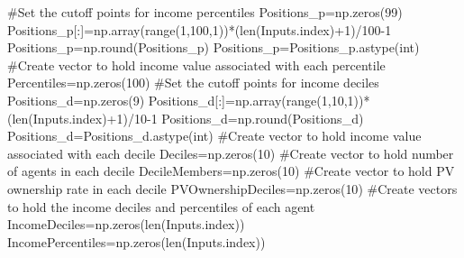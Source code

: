 \documentclass[
  letterpaper,
  DIV=11,
  numbers=noendperiod]{scrartcl}
\newenvironment{Shaded}{\begin{snugshade}}{\end{snugshade}}
\newcommand{\BuiltInTok}[1]{\textcolor[rgb]{0.00,0.23,0.31}{#1}}
\newcommand{\CommentTok}[1]{\textcolor[rgb]{0.37,0.37,0.37}{#1}}
\newcommand{\DecValTok}[1]{\textcolor[rgb]{0.68,0.00,0.00}{#1}}
\newcommand{\NormalTok}[1]{\textcolor[rgb]{0.00,0.23,0.31}{#1}}
\newcommand{\OperatorTok}[1]{\textcolor[rgb]{0.37,0.37,0.37}{#1}}
\begin{document}
\begin{Shaded}
\begin{Highlighting}[]
    \CommentTok{\#Set the cutoff points for income percentiles}
\NormalTok{    Positions\_p}\OperatorTok{=}\NormalTok{np.zeros(}\DecValTok{99}\NormalTok{)}
\NormalTok{    Positions\_p[:]}\OperatorTok{=}\NormalTok{np.array(}\BuiltInTok{range}\NormalTok{(}\DecValTok{1}\NormalTok{,}\DecValTok{100}\NormalTok{,}\DecValTok{1}\NormalTok{))}\OperatorTok{*}\NormalTok{(}\BuiltInTok{len}\NormalTok{(Inputs.index)}\OperatorTok{+}\DecValTok{1}\NormalTok{)}\OperatorTok{/}\DecValTok{100}\OperatorTok{{-}}\DecValTok{1}
\NormalTok{    Positions\_p}\OperatorTok{=}\NormalTok{np.}\BuiltInTok{round}\NormalTok{(Positions\_p)}
\NormalTok{    Positions\_p}\OperatorTok{=}\NormalTok{Positions\_p.astype(}\BuiltInTok{int}\NormalTok{)}
    \CommentTok{\#Create vector to hold income value associated with each percentile}
\NormalTok{    Percentiles}\OperatorTok{=}\NormalTok{np.zeros(}\DecValTok{100}\NormalTok{)}
    \CommentTok{\#Set the cutoff points for income deciles}
\NormalTok{    Positions\_d}\OperatorTok{=}\NormalTok{np.zeros(}\DecValTok{9}\NormalTok{)}
\NormalTok{    Positions\_d[:]}\OperatorTok{=}\NormalTok{np.array(}\BuiltInTok{range}\NormalTok{(}\DecValTok{1}\NormalTok{,}\DecValTok{10}\NormalTok{,}\DecValTok{1}\NormalTok{))}\OperatorTok{*}\NormalTok{(}\BuiltInTok{len}\NormalTok{(Inputs.index)}\OperatorTok{+}\DecValTok{1}\NormalTok{)}\OperatorTok{/}\DecValTok{10}\OperatorTok{{-}}\DecValTok{1}
\NormalTok{    Positions\_d}\OperatorTok{=}\NormalTok{np.}\BuiltInTok{round}\NormalTok{(Positions\_d)}
\NormalTok{    Positions\_d}\OperatorTok{=}\NormalTok{Positions\_d.astype(}\BuiltInTok{int}\NormalTok{)}
    \CommentTok{\#Create vector to hold income value associated with each decile}
\NormalTok{    Deciles}\OperatorTok{=}\NormalTok{np.zeros(}\DecValTok{10}\NormalTok{)}
    \CommentTok{\#Create vector to hold number of agents in each decile}
\NormalTok{    DecileMembers}\OperatorTok{=}\NormalTok{np.zeros(}\DecValTok{10}\NormalTok{)}
    \CommentTok{\#Create vector to hold PV ownership rate in each decile}
\NormalTok{    PVOwnershipDeciles}\OperatorTok{=}\NormalTok{np.zeros(}\DecValTok{10}\NormalTok{)}
    \CommentTok{\#Create vectors to hold the income deciles and percentiles of each agent}
\NormalTok{    IncomeDeciles}\OperatorTok{=}\NormalTok{np.zeros(}\BuiltInTok{len}\NormalTok{(Inputs.index))}
\NormalTok{    IncomePercentiles}\OperatorTok{=}\NormalTok{np.zeros(}\BuiltInTok{len}\NormalTok{(Inputs.index))}


\end{Highlighting}
\end{Shaded}
\end{document}
